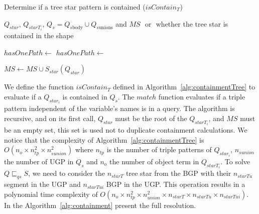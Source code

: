 \iffalse
While evaluating filter expressions would increase the algorithm's time complexity, it would also improve the precision of source selection.
However, ignoring them does not affect the completeness of results in our context.
Therefore, the tradeoff of including them in the resolution warrants an analysis.
\fi

\begin{algorithm}[h]
   \caption{Determine if a tree star pattern is contained ($isContain_{T}$)}\label{alg:containmentTree}
   \begin{algorithmic}
      \REQUIRE  $Q_{star}$, $Q_{starT_i}$, $Q_s = Q_{s\text{body}} \cup Q_{s\text{unions}}$ and $MS$
      \ENSURE \TRUE $ $ or \FALSE $ $ whether the tree star is contained in the shape

         \RETURN \TRUE
      \ENDIF 

            \STATE $hasOnePath \gets $ \FALSE
                  \STATE $hasOnePath \gets $ \TRUE
               \ENDIF
            \ENDFOR
               \RETURN \FALSE
            \ENDIF
         \ELSE
                  \RETURN \FALSE
               \ENDIF
            \ENDIF
         \ENDIF
      \ENDFOR

      \STATE $MS \gets MS \cup S_{star}(Q_{star})$
      \RETURN \TRUE
   \end{algorithmic}
\end{algorithm}


We define the function $isContain_{T}$ defined in Algorithm~\ref{alg:containmentTree} to evaluate if a $Q_{star_i}$ is contained in $Q_s$.
The $match$ function evaluates if a triple pattern independent of the variable's names is in a query.
The algorithm is recursive, and on its first call, $Q_{star}$ must be the root of the $Q_{starT_i}$, and $MS$ must be an empty set, 
this set is used not to duplicate containment calculations.
We notice that the complexity of Algorithm~\ref{alg:containmentTree} is $O( n_o \times n_{tp}^2 \times n_{sunion}^2)$
where $n_{tp}$ is the number of triple patterns of $Q_{star_i}$, $n_{sunion}$ the number of UGP in $Q_s$ and $n_o$ the number of object term in $Q_{starT_i}$.
To solve $Q \sqsubseteq_{qs} S$, we need to consider the $n_{starT}$ tree star from the BGP with their $n_{starTu}$ segment in the UGP and $n_{starTui}$ BGP in the UGP.
This operation results in a polynomial time complexity of $O(n_o \times n_{tp}^2 \times n_{union}^2 \times n_{starT} \times n_{starTu} \times n_{starTui})$.
In the  Algorithm~\ref{alg:containment} present the full resolution.

